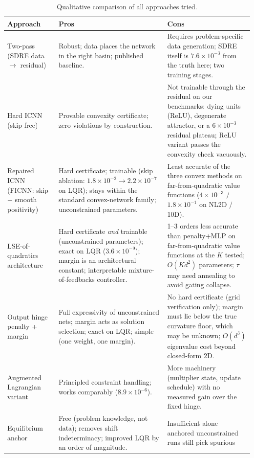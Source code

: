 \documentclass[11pt,a4paper]{article}
\begin{document}
\begin{table}[h]
\centering\small
\caption{Qualitative comparison of all approaches tried.}
\label{tab:proscons}
\begin{tabularx}{\textwidth}{lXX}
\toprule
Approach & Pros & Cons \\
\midrule
Two-pass (SDRE data $\to$ residual) \cite{borovykh2022data} &
Robust; data places the network in the right basin; published baseline. &
Requires problem-specific data generation; SDRE itself is $7.6\times10^{-3}$
from the truth here; two training stages. \\
\addlinespace
Hard ICNN (skip-free) &
Provable convexity certificate; zero violations by construction. &
Not trainable through the residual on our benchmarks: dying units (ReLU),
degenerate attractor, or a $6\times10^{-3}$ residual plateau; ReLU variant
passes the convexity check vacuously. \\
\addlinespace
Repaired ICNN (FICNN: skip + smooth positivity) &
Hard certificate; trainable (skip ablation: $1.8\times10^{-2}\to
2.2\times10^{-7}$ on LQR); stays within the standard convex-network family;
unconstrained parameters. &
Least accurate of the three convex methods on far-from-quadratic value
functions ($4\times10^{-3}$ / $1.8\times10^{-1}$ on NL2D / 10D). \\
\addlinespace
LSE-of-quadratics architecture &
Hard certificate \emph{and} trainable (unconstrained parameters); exact on
LQR ($3.6\times10^{-9}$); margin is an architectural constant; interpretable
mixture-of-feedbacks controller. &
1--3 orders less accurate than penalty+MLP on far-from-quadratic value
functions at the $K$ tested; $O(Kd^2)$ parameters; $\tau$ may need annealing
to avoid gating collapse. \\
\addlinespace
Output hinge penalty + margin &
Full expressivity of unconstrained nets; margin acts as solution selection;
exact on LQR; simple (one weight, one margin). &
No hard certificate (grid verification only); margin must lie below the true
curvature floor, which may be unknown; $O(d^3)$ eigenvalue cost beyond
closed-form 2D. \\
\addlinespace
Augmented Lagrangian variant &
Principled constraint handling; works comparably ($8.9\times10^{-6}$). &
More machinery (multiplier state, update schedule) with no measured gain
over the fixed hinge. \\
\addlinespace
Equilibrium anchor &
Free (problem knowledge, not data); removes shift indeterminacy; improved
LQR by an order of magnitude. &
Insufficient alone --- anchored unconstrained runs still pick spurious

\end{tabularx}
\end{table}
\end{document}
